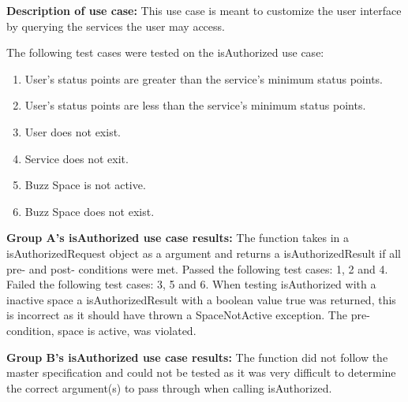 \textbf{Description of use case:}\newline
This use case is meant to customize the user interface by querying the services the user may access.
\medskip

\noindent
The following test cases were tested on the isAuthorized use case:
\begin{enumerate}
	\item User's status points are greater than the service's minimum status points.
	\item User's status points are less than the service's minimum status points.
	\item User does not exist.
  	\item Service does not exit.
  	\item Buzz Space is not active.
  	\item Buzz Space does not exist.
\end{enumerate}
\medskip
\noindent
\textbf{Group A's isAuthorized use case results:}\newline
The function takes in a isAuthorizedRequest object as a argument and returns a isAuthorizedResult if all pre- and post- conditions were met.\newline
Passed the following test cases: 1, 2 and 4.\newline
Failed the following test cases: 3, 5 and 6.\newline
When testing isAuthorized with a inactive space a isAuthorizedResult with a boolean value true was returned, this is incorrect as it should have thrown a SpaceNotActive exception. The pre-condition, space is active, was violated.
\medskip

\noindent
\textbf{Group B's isAuthorized use case results:}\newline
The function did not follow the master specification and could not be tested as it was very difficult to determine the correct argument(s) to pass through when calling isAuthorized. 